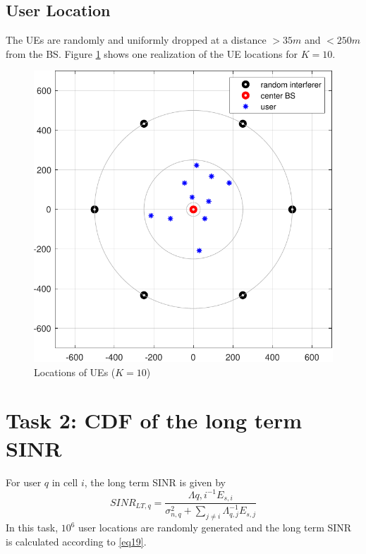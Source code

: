 \documentclass[10pt,conference]{IEEEtran}
\begin{document}
\subsection{User Location}
The UEs are randomly and uniformly dropped at a distance $> 35m$ and $< 250m$ from 
the BS. Figure \ref{fig1} shows one realization of the UE locations for $K=10$.
\begin{figure}
    \centering
    \includegraphics[width=1\linewidth]{Fig1.pdf}
    \caption{Locations of UEs ($K=10$)}
    \label{fig1}
\end{figure}

\section{Task 2: CDF of the long term SINR}
For user $q$ in cell $i$, the long term SINR is given by 
\begin{equation}
    SINR_{LT,q} = \frac{\Lambda{q,i}^{-1} E_{s,i}}{\sigma^2_{n,q} + \sum_{j \neq i} \Lambda_{q,j}^{-1} E_{s,j}} \label{eq19}
\end{equation}
In this task, $10^6$ user locations are randomly generated and 
the long term SINR is calculated according to \eqref{eq19}.
\end{document}
